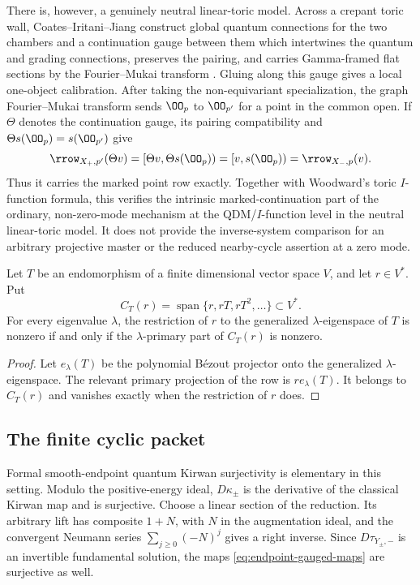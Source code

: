 \begin{remark}
There is, however, a genuinely neutral linear-toric model.  Across a crepant
toric wall, Coates--Iritani--Jiang construct global quantum connections for
the two chambers and a continuation gauge between them which intertwines the
quantum and grading connections, preserves the pairing, and carries
Gamma-framed flat sections by the Fourier--Mukai transform
\cite[Theorems~6.1 and 6.3]{CoatesIritaniJiang}.  Gluing along this gauge gives
a local one-object calibration.  After taking the non-equivariant
specialization, the graph Fourier--Mukai transform sends \(\OO_p\) to
\(\OO_{p'}\) for a point in the common open.  If \(\Theta\) denotes the
continuation gauge, its pairing compatibility and
\(\Theta s(\OO_p)=s(\OO_{p'})\) give
\[
 \rrow_{X_+,p'}(\Theta v)
 = [\Theta v,\Theta s(\OO_p))
 = [v,s(\OO_p))
 = \rrow_{X_-,p}(v).
\]
Thus it carries the marked point row exactly.  Together with Woodward's toric
\(I\)-function formula, this verifies the intrinsic marked-continuation part
of the ordinary, non-zero-mode mechanism at the QDM/\(I\)-function level in
the neutral linear-toric model.  It does not provide the
inverse-system comparison for an arbitrary projective master or the reduced
nearby-cycle assertion at a zero mode.
\end{remark}

\begin{lemma}
\label{lem:cyclic-row-support}
Let \(T\) be an endomorphism of a finite dimensional vector space \(V\), and
let \(r\in V^*\).  Put
\[
 C_T(r)=\operatorname{span}\{r,rT,rT^2,\ldots\}\subset V^*.
\]
For every eigenvalue \(\lambda\), the restriction of \(r\) to the generalized
\(\lambda\)-eigenspace of \(T\) is nonzero if and only if the
\(\lambda\)-primary part of \(C_T(r)\) is nonzero.
\end{lemma}

\begin{proof}
Let \(e_\lambda(T)\) be the polynomial B\'ezout projector onto the generalized
\(\lambda\)-eigenspace.  The relevant primary projection of the row is
\(re_\lambda(T)\).  It belongs to \(C_T(r)\) and vanishes exactly when the
restriction of \(r\) does.
\end{proof}

\subsection{The finite cyclic packet}

Formal smooth-endpoint quantum Kirwan surjectivity is elementary in this
setting.  Modulo the positive-energy ideal, \(D\kappa_\pm\) is the derivative
of the classical Kirwan map and is surjective.  Choose a linear section of
the reduction.  Its arbitrary lift has composite \(1+N\), with \(N\) in the
augmentation ideal, and the convergent Neumann series
\(\sum_{j\geq0}(-N)^j\) gives a right inverse.  Since
\(D\tau_{Y_\pm,-}\) is an invertible fundamental solution, the maps
\eqref{eq:endpoint-gauged-maps}
are surjective as well.

